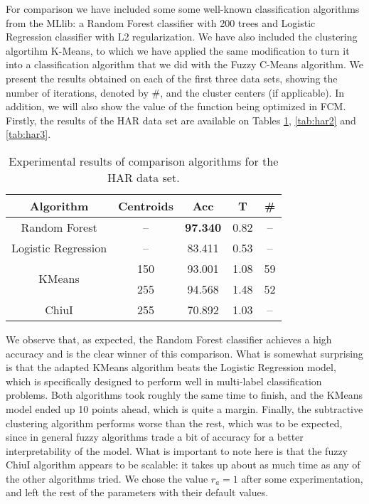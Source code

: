 For comparison we have included some some well-known classification algorithms from the MLlib: a Random Forest classifier with 200 trees and Logistic Regression classifier with L2 regularization. We have also included the clustering algortihm K-Means, to which we have applied the same modification to turn it into a classification algorithm that we did with the Fuzzy C-Means algorithm. We present the results obtained on each of the first three data sets, showing the number of iterations, denoted by \#, and the cluster centers (if applicable). In addition, we will also show the value of the function being optimized in FCM. Firstly, the results of the HAR data set are available on Tables \ref{tab:har1}, \ref{tab:har2} and \ref{tab:har3}.

\begin{table}[h!]
  \centering
\caption{Experimental results of comparison algorithms for the HAR data set.}
\label{tab:har1}
\begin{tabular}{ccccc}
\toprule
Algorithm & Centroids & Acc& T & \# \\ \midrule
Random Forest & -- & \textbf{97.340} & 0.82 & -- \\
Logistic Regression & --& 83.411 & 0.53 & -- \\
\multirow{2}{*}{KMeans} & 150 & 93.001 & 1.08 & 59 \\
& 255 & 94.568 &  1.48 & 52\\
ChiuI & 255 & 70.892 &  1.03 & -- \\ \bottomrule
\end{tabular}
\end{table}

We observe that, as expected, the Random Forest classifier achieves a high accuracy and is the clear winner of this comparison. What is somewhat surprising is that the adapted KMeans algorithm beats the Logistic Regression model, which is specifically designed to perform well in multi-label classification problems. Both algorithms took roughly the same time to finish, and the KMeans model ended up 10 points ahead, which is quite a margin. Finally, the subtractive clustering algorithm performs worse than the rest, which was to be expected, since in general fuzzy algorithms trade a bit of accuracy for a better interpretability of the model. What is important to note here is that the fuzzy ChiuI algorithm appears to be scalable: it takes up about as much time as any of the other algorithms tried. We chose the value $r_a=1$ after some experimentation, and left the rest of the parameters with their default values.

